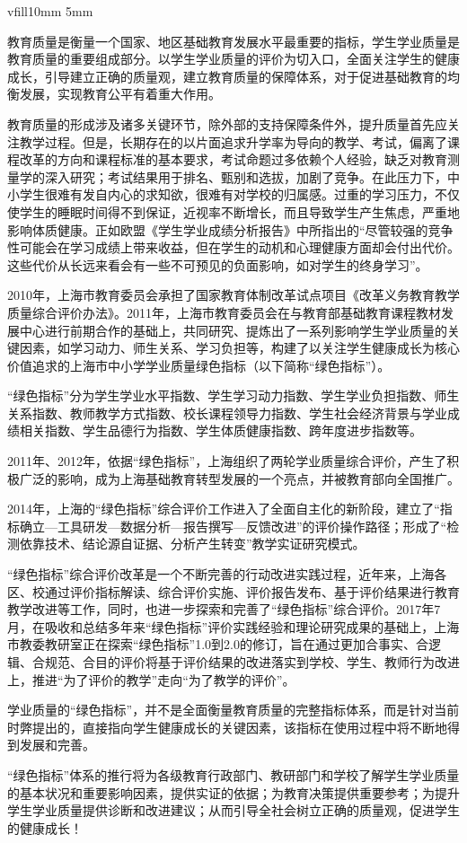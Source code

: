 vfill{10mm}
\vfill{5mm}
\myprefacetext

教育质量是衡量一个国家、地区基础教育发展水平最重要的指标，学生学业质量是教育质量的重要组成部分。以学生学业质量的评价为切入口，全面关注学生的健康成长，引导建立正确的质量观，建立教育质量的保障体系，对于促进基础教育的均衡发展，实现教育公平有着重大作用。

教育质量的形成涉及诸多关键环节，除外部的支持保障条件外，提升质量首先应关注教学过程。但是，长期存在的以片面追求升学率为导向的教学、考试，偏离了课程改革的方向和课程标准的基本要求，考试命题过多依赖个人经验，缺乏对教育测量学的深入研究；考试结果用于排名、甄别和选拔，加剧了竞争。在此压力下，中小学生很难有发自内心的求知欲，很难有对学校的归属感。过重的学习压力，不仅使学生的睡眠时间得不到保证，近视率不断增长，而且导致学生产生焦虑，严重地影响体质健康。正如欧盟《学生学业成绩分析报告》中所指出的“尽管较强的竞争性可能会在学习成绩上带来收益，但在学生的动机和心理健康方面却会付出代价。这些代价从长远来看会有一些不可预见的负面影响，如对学生的终身学习”。

2010年，上海市教育委员会承担了国家教育体制改革试点项目《改革义务教育教学质量综合评价办法》。2011年，上海市教育委员会在与教育部基础教育课程教材发展中心进行前期合作的基础上，共同研究、提炼出了一系列影响学生学业质量的关键因素，如学习动力、师生关系、学习负担等，构建了以关注学生健康成长为核心价值追求的上海市中小学学业质量绿色指标（以下简称“绿色指标”）。


“绿色指标”分为学生学业水平指数、学生学习动力指数、学生学业负担指数、师生关系指数、教师教学方式指数、校长课程领导力指数、学生社会经济背景与学业成绩相关指数、学生品德行为指数、学生体质健康指数、跨年度进步指数等。


2011年、2012年，依据“绿色指标”，上海组织了两轮学业质量综合评价，产生了积极广泛的影响，成为上海基础教育转型发展的一个亮点，并被教育部向全国推广。


2014年，上海的“绿色指标”综合评价工作进入了全面自主化的新阶段，建立了“指标确立—工具研发—数据分析—报告撰写—反馈改进”的评价操作路径；形成了“检测依靠技术、结论源自证据、分析产生转变”教学实证研究模式。


“绿色指标”综合评价改革是一个不断完善的行动改进实践过程，近年来，上海各区、校通过评价指标解读、综合评价实施、评价报告发布、基于评价结果进行教育教学改进等工作，同时，也进一步探索和完善了“绿色指标”综合评价。2017年7月，在吸收和总结多年来“绿色指标”评价实践经验和理论研究成果的基础上，上海市教委教研室正在探索“绿色指标”1.0到2.0的修订，旨在通过更加合事实、合逻辑、合规范、合目的评价将基于评价结果的改进落实到学校、学生、教师行为改进上，推进“为了评价的教学”走向“为了教学的评价”。


学业质量的“绿色指标”，并不是全面衡量教育质量的完整指标体系，而是针对当前时弊提出的，直接指向学生健康成长的关键因素，该指标在使用过程中将不断地得到发展和完善。


“绿色指标”体系的推行将为各级教育行政部门、教研部门和学校了解学生学业质量的基本状况和重要影响因素，提供实证的依据；为教育决策提供重要参考；为提升学生学业质量提供诊断和改进建议；从而引导全社会树立正确的质量观，促进学生的健康成长！

\clearpage
